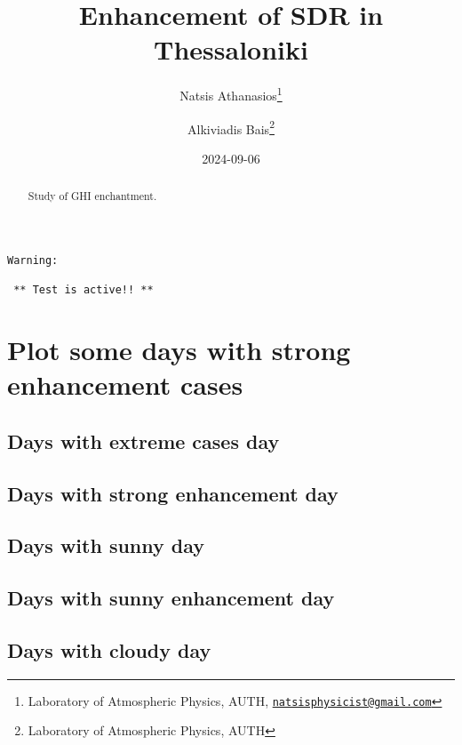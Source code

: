 \documentclass[
  10pt,
  a4paper,oneside]{article}
\title{Enhancement of SDR in Thessaloniki}
\author{Natsis Athanasios\footnote{Laboratory of Atmospheric Physics, AUTH, \href{mailto:natsisphysicist@gmail.com}{\nolinkurl{natsisphysicist@gmail.com}}} \and Alkiviadis Bais\footnote{Laboratory of Atmospheric Physics, AUTH}}
\date{2024-09-06}
\begin{document}
\maketitle
\begin{abstract}
Study of GHI enchantment.
\end{abstract}

{
\hypersetup{linkcolor=}
\setcounter{tocdepth}{4}
\tableofcontents
}
\begin{verbatim}
Warning: 

 ** Test is active!! ** 
\end{verbatim}

\FloatBarrier

\section{Plot some days with strong enhancement cases}\label{plot-some-days-with-strong-enhancement-cases}

\FloatBarrier

\subsection{Days with extreme cases day}\label{days-with-extreme-cases-day}

\FloatBarrier

\subsection{Days with strong enhancement day}\label{days-with-strong-enhancement-day}

\FloatBarrier

\subsection{Days with sunny day}\label{days-with-sunny-day}

\FloatBarrier

\subsection{Days with sunny enhancement day}\label{days-with-sunny-enhancement-day}

\FloatBarrier

\subsection{Days with cloudy day}\label{days-with-cloudy-day}
\end{document}
